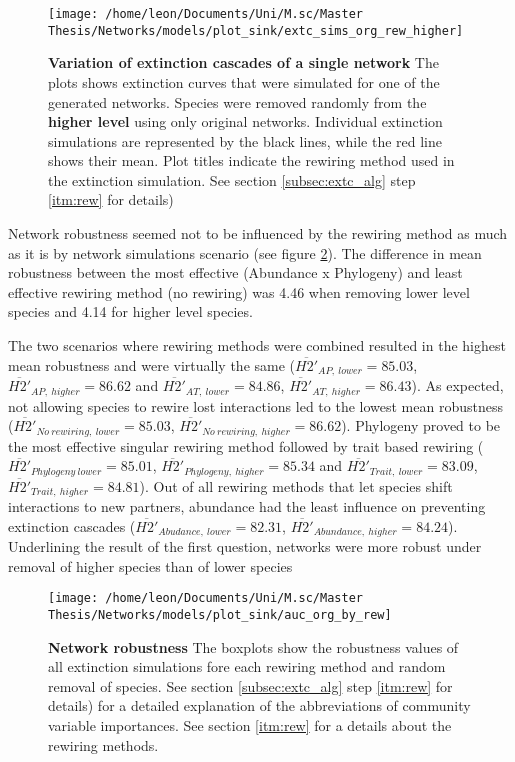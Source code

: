\documentclass[12pt,a4paper]{article}
\begin{document}
\begin{figure}[H]
	 \centering
	 \texttt{[image: /home/leon/Documents/Uni/M.sc/Master Thesis/Networks/models/plot\_sink/extc\_sims\_org\_rew\_higher]}
	 \captionsetup{width = \textwidth}
	 \caption{\textbf{Variation of extinction cascades of a single network} The plots shows extinction curves that were simulated for one of the generated networks. Species were removed randomly from the \textbf{higher level} using only original networks. Individual extinction simulations are represented by the black lines, while the red line shows their mean. Plot titles indicate the rewiring method used in the extinction simulation. See section \ref{subsec:extc_alg} step \ref{itm:rew} for details)}
	 \label{fig:extc_org_rew_higher}
\end{figure}

Network robustness seemed not to be influenced by the rewiring method as much as it is by network simulations scenario (see figure \ref{fig:auc_org_rew}). The difference in mean robustness between the most effective (Abundance x Phylogeny) and least effective rewiring method (no rewiring) was 4.46 when removing lower level species and 4.14 for higher level species. 

The two scenarios where rewiring methods were combined resulted in the highest mean robustness and were virtually the same ($ \overline{H2'}_{AP,\: lower} = 85.03 $, $ \overline{H2'}_{AP, \:higher} = 86.62 $ and $ \overline{H2'}_{AT,\: lower} = 84.86  $, $ \overline{H2'}_{AT,\: higher} = 86.43 $). As expected, not allowing species to rewire lost interactions led to the lowest mean robustness ($\overline{H2'}_{No\:rewiring,\: lower} = 85.03 $, $ \overline{H2'}_{No\:rewiring,\: higher} = 86.62 $). Phylogeny proved to be the most effective singular rewiring method followed by trait based rewiring ($\overline{H2'}_{Phylogeny\: lower} = 85.01 $, $ \overline{H2'}_{Phylogeny,\: higher} = 85.34 $ and $\overline{H2'}_{Trait,\: lower} = 83.09 $, $ \overline{H2'}_{Trait,\: higher} = 84.81 $). Out of all rewiring methods that let species shift interactions to new partners, abundance had the least influence on preventing extinction cascades ($\overline{H2'}_{Abudance,\: lower} = 82.31 $, $ \overline{H2'}_{Abundance,\: higher} = 84.24 $). 
Underlining the result of the first question, networks were more robust under removal of higher species than of lower species \par 


\begin{figure}[H]
	 \centering
	 \texttt{[image: /home/leon/Documents/Uni/M.sc/Master Thesis/Networks/models/plot\_sink/auc\_org\_by\_rew]}
	 \captionsetup{width = .8\textwidth}
	 \caption{\textbf{Network robustness } The boxplots show the robustness values of all extinction simulations fore each rewiring method and random removal of species. See section \ref{subsec:extc_alg} step \ref{itm:rew} for details) for a detailed explanation of the abbreviations of community variable importances. See section \ref{itm:rew} for a details about the rewiring methods.}
	 \label{fig:auc_org_rew}
\end{figure}
\end{document}
